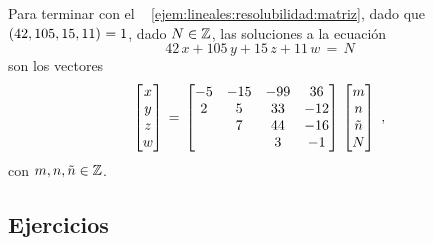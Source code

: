 \begin{ejemLineales}\label{ejem:lineales:resolubilidad:soluciones}
	Para terminar con el \ejemname~%
	\ref{ejem:lineales:resolubilidad:matriz},
	dado que $\left({42,105,15,11}\right)_{}=1$, dado $N\in\mathbb{Z}$,
	las soluciones a la ecuaci\'on
	\begin{displaymath}
		42\,x+105\,y+15\,z+11\,w\,=\,N
	\end{displaymath}
	son los vectores
	\begin{displaymath}
		\begin{bmatrix} x \\ y \\ z \\ w \end{bmatrix} \,=\,
			\begin{bmatrix}
				-5 & -15 & -99 & 36 \\
				2 & 5 & 33 & -12 \\
				& 7 & 44 & -16 \\
				& & 3 & -1
			\end{bmatrix}\,
			\begin{bmatrix} m \\ n \\ \tilde n \\ N \end{bmatrix}
		\text{ ,}
	\end{displaymath}
	con $m,n,\tilde n\in\mathbb{Z}$.
\end{ejemLineales}

\subsection*{Ejercicios}


